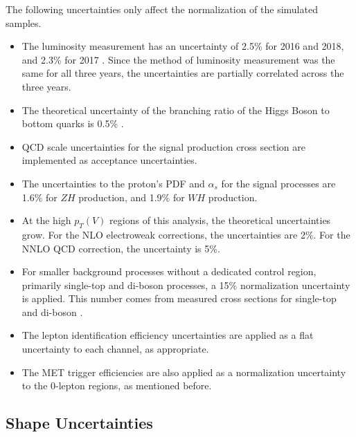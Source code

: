 The following uncertainties only affect the normalization of the simulated samples.
\begin{itemize}
\item The luminosity measurement has an uncertainty of
  2.5\% for 2016 and 2018, and 2.3\% for 2017
  \cite{CMS-PAS-LUM-17-001,CMS-PAS-LUM-17-004,CMS-PAS-LUM-18-002}.
  Since the method of luminosity measurement was the same for all three years,
  the uncertainties are partially correlated across the three years.
\item The theoretical uncertainty of the branching ratio of the Higgs Boson
  to bottom quarks is 0.5\% \cite{DeFlorianSabaris:2215893}.
\item QCD scale uncertainties for the signal production cross section
  are implemented as acceptance uncertainties.
\item The uncertainties to the proton's PDF and $\alpha_s$ for the signal processes
  are 1.6\% for $Z\!H$ production, and 1.9\% for $W\!H$ production.
\item At the high $p_T(V)$ regions of this analysis, the theoretical uncertainties grow.
  For the NLO electroweak corrections, the uncertainties are 2\%.
  For the NNLO QCD correction, the uncertainty is 5\%.
\item For smaller background processes without a dedicated control region,
  primarily single-top and di-boson processes, a 15\% normalization uncertainty is applied.
  This number comes from measured cross sections for single-top \cite{2017752}
  and di-boson \cite{2017533}.
\item The lepton identification efficiency uncertainties are applied as a flat uncertainty
  to each channel, as appropriate.
\item The MET trigger efficiencies are also applied as a normalization uncertainty
  to the 0-lepton regions, as mentioned before.
\end{itemize}

\subsection{Shape Uncertainties}

